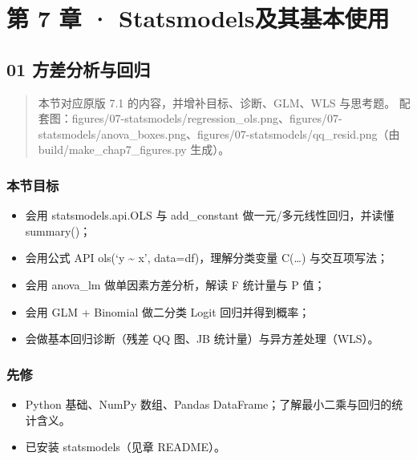 \chapter{第 7 章 ·
Statsmodels及其基本使用}\label{ux7b2c-7-ux7ae0-statsmodelsux53caux5176ux57faux672cux4f7fux7528}

\section{01
方差分析与回归}\label{ux65b9ux5deeux5206ux6790ux4e0eux56deux5f52}

\begin{quote}
本节对应原版 7.1 的内容，并增补目标、诊断、GLM、WLS 与思考题。
配套图：figures/07-statsmodels/regression\_ols.png、figures/07-statsmodels/anova\_boxes.png、figures/07-statsmodels/qq\_resid.png（由
build/make\_chap7\_figures.py 生成）。
\end{quote}

\subsection{本节目标}\label{ux672cux8282ux76eeux6807-26}

\begin{itemize}
\tightlist
\item
  会用 statsmodels.api.OLS 与 add\_constant 做一元/多元线性回归，并读懂
  summary()；
\item
  会用公式 API ols(`y \textasciitilde{} x', data=df)，理解分类变量
  C(\ldots) 与交互项写法；
\item
  会用 anova\_lm 做单因素方差分析，解读 F 统计量与 P 值；
\item
  会用 GLM + Binomial 做二分类 Logit 回归并得到概率；
\item
  会做基本回归诊断（残差 QQ 图、JB 统计量）与异方差处理（WLS）。
\end{itemize}

\subsection{先修}\label{ux5148ux4fee-19}

\begin{itemize}
\tightlist
\item
  Python 基础、NumPy 数组、Pandas
  DataFrame；了解最小二乘与回归的统计含义。
\item
  已安装 statsmodels（见章 README）。
\end{itemize}

